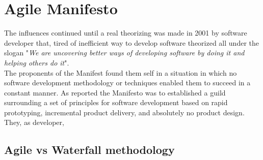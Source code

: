 \documentclass[../main.tex]{subfiles}
\newcommand\connecttw[2]%
  {\draw[->,thick] (#1) -| (#2);
   \draw[->,thick] (#2) -| (#1);
  }
\newcommand\connectow[2]%
  {\draw[thick, ->] (#1) |- (#2);
  }
\begin{document}
\section{Agile Manifesto}
The influences continued until a real theorizing was made in 2001 by software developer that, tired of inefficient way to develop software theorized all under the slogan "\textit{We are uncovering better ways of developing software by doing it and helping others do it}". \\
The proponents of the Manifest found them self in a situation in which no software development methodology or techniques enabled them to succeed in a constant manner. As reported \citet{schmidt2013software} the Manifesto was to established a guild surrounding a set of principles for software development based on rapid prototyping, incremental product delivery, and absolutely no product design. They, as developer, 
\subsection{Agile vs Waterfall methodology}


    
\end{document}
